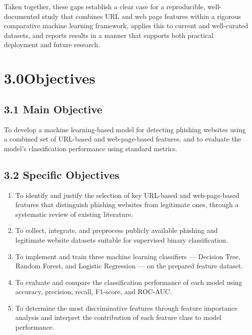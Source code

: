 \documentclass[11pt,letterpaper]{article}
\begin{document}
Taken together, these gaps establish a clear case for a reproducible, well-documented study that combines URL and web page features within a rigorous comparative machine learning framework, applies this to current and well-curated datasets, and reports results in a manner that supports both practical deployment and future research.

\newpage
\section*{3.0\quad Objectives}

\subsection*{3.1 Main Objective}

To develop a machine learning-based model for detecting phishing websites using a combined set of URL-based and web-page-based features, and to evaluate the model's classification performance using standard metrics.

\subsection*{3.2 Specific Objectives}

\begin{enumerate}[leftmargin=1.4cm,label=\arabic*.]
    \item To identify and justify the selection of key URL-based and web-page-based features that distinguish phishing websites from legitimate ones, through a systematic review of existing literature.
    \item To collect, integrate, and preprocess publicly available phishing and legitimate website datasets suitable for supervised binary classification.
    \item To implement and train three machine learning classifiers --- Decision Tree, Random Forest, and Logistic Regression --- on the prepared feature dataset.
    \item To evaluate and compare the classification performance of each model using accuracy, precision, recall, F1-score, and ROC-AUC.
    \item To determine the most discriminative features through feature importance analysis and interpret the contribution of each feature class to model performance.
\end{enumerate}
\end{document}
